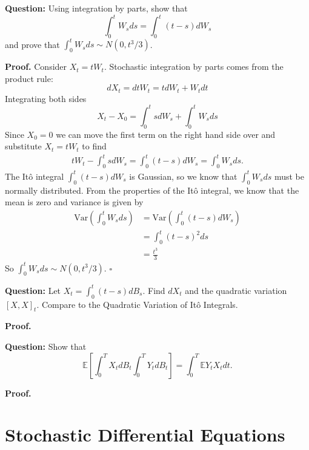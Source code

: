 \documentclass{article}
\begin{document}
\begin{tcolorbox}[colframe=black,colback=gray!5,boxrule=0.5pt]
\textbf{Question:} Using integration by parts, show that 
$$\int_0^tW_sds = \int_0^t(t-s)dW_s$$
and prove that $\int_0^t W_sds\sim N(0, t^3/3)$. 
\end{tcolorbox}
\textbf{Proof.} Consider $X_t = tW_t$. Stochastic integration by parts comes from the product rule: 
$$dX_t = dtW_t = tdW_t +W_tdt$$
Integrating both sides 
$$X_t - X_0 = \int_0^t sdW_s + \int_0^t W_sds$$
Since $X_0 = 0$ we can move the first term on the right hand side over and substitute $X_t = tW_t$ to find 
\begin{align*}
    tW_t - \int_0^tsdW_s = \int_0^t(t-s)dW_s = \int_0^tW_sds.
\end{align*}
The Itô integral $\int_0^t(t-s)dW_s$ is Gaussian, so we know that $\int_0^tW_sds$ must be normally distributed. From the properties of the Itô integral, we know that the mean is zero and variance is given by 
\begin{align*}
    \text{Var}\left(\int_0^tW_sds\right) &= \text{Var}\left(\int_0^t(t-s)dW_s\right) \\
    &= \int_0^t(t-s)^2ds \\
    &= \frac{t^3}{3}
\end{align*}
So $\int_0^tW_sds\sim N(0,t^3/3)$. $\square$

\begin{tcolorbox}[colframe=black,colback=gray!5,boxrule=0.5pt]
\textbf{Question:} Let $X_t = \int_0^t(t-s)dB_s$. Find $dX_t$ and the quadratic variation $[X,X]_t$. Compare to the Quadratic Variation of Itô Integrals.
\end{tcolorbox}
\textbf{Proof.}


\begin{tcolorbox}[colframe=black,colback=gray!5,boxrule=0.5pt]
\textbf{Question:} Show that 
$$\mathbb{E}\left[\int_0^TX_tdB_t\int_0^TY_tdB_t\right] = \int_0^T\mathbb{E}Y_tX_tdt.$$
\end{tcolorbox}
\textbf{Proof.}


\newpage
\section{Stochastic Differential Equations}
\end{document}
